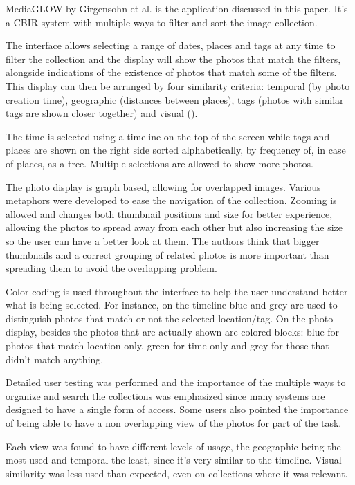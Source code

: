 MediaGLOW by Girgensohn et al. \cite{Girgensohn:2010} is the application discussed in this paper. It's a \ac{CBIR} system with multiple ways to filter and sort the image collection.

The interface allows selecting a range of dates, places and tags at any time to filter the collection and the display will show the photos that match the filters, alongside indications of the existence of photos that match some of the filters. This display can then be arranged by four similarity criteria: temporal (by photo creation time), geographic (distances between places), tags (photos with similar tags are shown closer together) and visual ().

The time is selected using a timeline on the top of the screen while tags and places are shown on the right side sorted alphabetically, by frequency of, in case of places, as a tree. Multiple selections are allowed to show more photos.

The photo display is graph based, allowing for overlapped images. Various metaphors were developed to ease the navigation of the collection. Zooming is allowed and changes both thumbnail positions and size for better experience, allowing the photos to spread away from each other but also increasing the size so the user can have a better look at them. The authors think that bigger thumbnails and a correct grouping of related photos is more important than spreading them to avoid the overlapping problem.

Color coding is used throughout the interface to help the user understand better what is being selected. For instance, on the timeline blue and grey are used to distinguish photos that match or not the selected location/tag. On the photo display, besides the photos that are actually shown are colored blocks: blue for photos that match location only, green for time only and grey for those that didn't match anything.

Detailed user testing was performed and the importance of the multiple ways to organize and search the collections was emphasized since many systems are designed to have a single form of access. Some users also pointed the importance of being able to have a non overlapping view of the photos for part of the task.

Each view was found to have different levels of usage, the geographic being the most used and temporal the least, since it's very similar to the timeline. Visual similarity was less used than expected, even on collections where it was relevant. 




